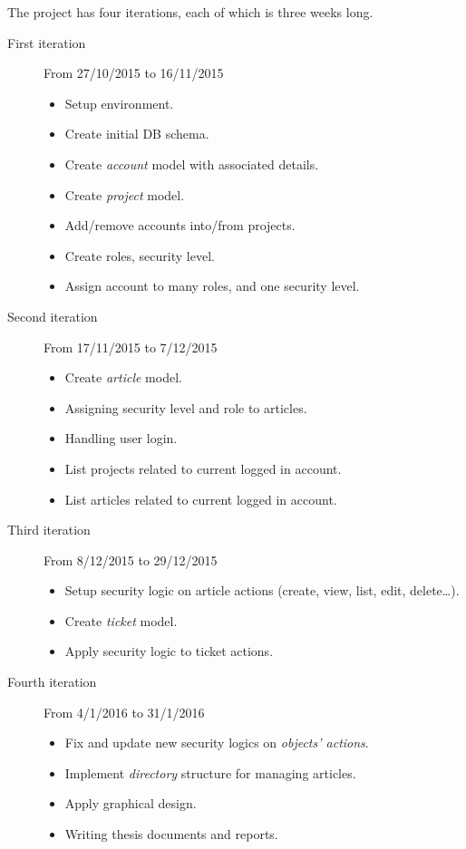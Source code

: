 The project has four iterations, each of which is three weeks long.

\begin{description}
\item[First iteration]
From 27/10/2015 to 16/11/2015
\begin{itemize}
\item Setup environment. 
\item Create initial DB schema. 
\item Create \emph{account} model with associated details. 
\item Create \emph{project} model. 
\item Add/remove accounts into/from projects. 
\item Create roles, security level. 
\item Assign account to many roles, and one security level.
\end{itemize}

\item[Second iteration]
From 17/11/2015 to 7/12/2015
\begin{itemize}
\item Create \emph{article} model.
\item Assigning security level and role to articles. 
\item Handling user login.
\item List projects related to current logged in account.
\item List articles related to current logged in account.
\end{itemize}

\item[Third iteration]
From 8/12/2015 to 29/12/2015
\begin{itemize}
\item Setup security logic on article actions (\eg create, view, list, edit, delete\dots). 
\item Create \emph{ticket} model. 
\item Apply security logic to ticket actions.
\end{itemize}

\item[Fourth iteration]
From 4/1/2016 to 31/1/2016
\begin{itemize}
\item Fix and update new security logics on \emph{objects' actions}.
\item Implement \emph{directory} structure for managing articles.
\item Apply graphical design.
\item Writing thesis documents and reports.
\end{itemize}
\end{description}
 
